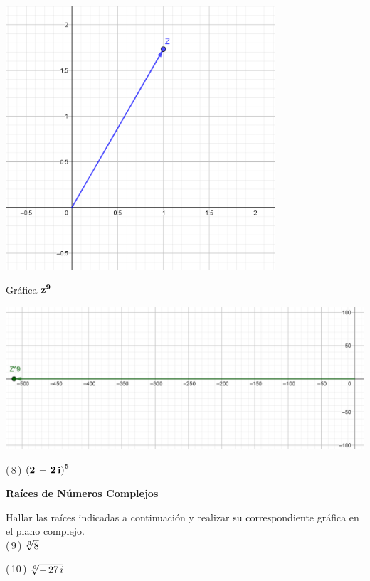 \documentclass[a4paper,11pt,openany]{book}
\begin{document}
\begin{center}
    \includegraphics[width=10cm]{Gra-Ej-7-1.png}
\end{center}

\textcolor{ao(english)}{} Gráfica $\bf{z^{9}}$

\begin{center}
    \includegraphics[width=15cm]{Gra-Ej-7-2.png}
\end{center}

\textcolor{ao(english)}{(\,8\,)} $\bf{\left(2\,-\,2\,i\right)^{5}}$

\begin{center}
\textbf{Raíces de Números Complejos}
\end{center}

Hallar las raíces indicadas a continuación y realizar su correspondiente gráfica en el plano complejo.\\

\textcolor{ao(english)}{(\,9\,)} $\bf{\sqrt[3]{8}}$

\textcolor{ao(english)}{(\,10\,)} $\bf{\sqrt[6]{-\,27\,i}}$
\end{document}
